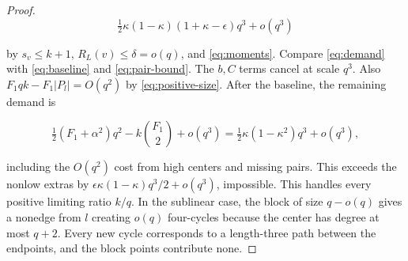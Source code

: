 \documentclass[11pt,reqno]{amsart}
\theoremstyle{definition}
\theoremstyle{remark}
\numberwithin{equation}{section}
\begin{document}
\begin{proof}
\[
\tfrac12\kappa(1-\kappa)(1+\kappa-\epsilon)q^3+o(q^3)
\]

by \(s_v\le k+1\), \(R_L(v)\le\delta=o(q)\), and \eqref{eq:moments}. Compare \eqref{eq:demand} with \eqref{eq:baseline} and \eqref{eq:pair-bound}. The \(b,C\) terms cancel at scale \(q^3\). Also \(F_1qk-F_1|P_l|=O(q^2)\) by \eqref{eq:positive-size}. After the baseline, the remaining demand is

\[
\tfrac12(F_1+\alpha^2)q^2-k\binom{F_1}2+o(q^3)
=\tfrac12\kappa(1-\kappa^2)q^3+o(q^3),
\]

including the \(O(q^2)\) cost from high centers and missing pairs. This exceeds the nonlow extras by \(\epsilon\kappa(1-\kappa)q^3/2+o(q^3)\), impossible. This handles every positive limiting ratio \(k/q\). In the sublinear case, the block of size \(q-o(q)\) gives a nonedge from \(l\) creating \(o(q)\) four-cycles because the center has degree at most \(q+2\). Every new cycle corresponds to a length-three path between the endpoints, and the block points contribute none.

\end{proof}
\end{document}
